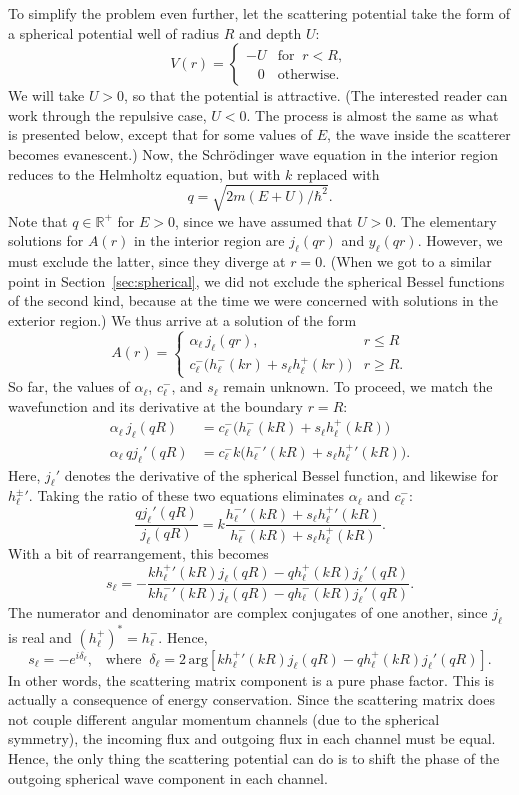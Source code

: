 \documentclass[pra,12pt]{revtex4}
\begin{document}
To simplify the problem even further, let the scattering potential
take the form of a spherical potential well of radius $R$ and depth
$U$:
$$V(r) = \begin{cases}-U &\mathrm{for}\;\; r < R, \\ \;\;\; 0 & \mathrm{otherwise}.\end{cases}$$
We will take $U > 0$, so that the potential is attractive.  (The
interested reader can work through the repulsive case, $U < 0$.  The
process is almost the same as what is presented below, except that for
some values of $E$, the wave inside the scatterer becomes evanescent.)
Now, the Schr\"odinger wave equation in the interior region reduces to
the Helmholtz equation, but with $k$ replaced with
$$q = \sqrt{2m(E+U)/\hbar^2}.$$
Note that $q \in \mathbb{R}^+$ for $E > 0$, since we have assumed
that $U > 0$.  The elementary solutions for $A(r)$ in the interior
region are $j_\ell(qr)$ and $y_\ell(qr)$.  However, we must exclude
the latter, since they diverge at $r = 0$.  (When we got to a similar
point in Section~\ref{sec:spherical}, we did not exclude the spherical
Bessel functions of the second kind, because at the time we were
concerned with solutions in the exterior region.)  We thus arrive at a
solution of the form
$$A(r) = \begin{cases} \alpha_\ell\, j_\ell(qr), & r \le R \\ c^-_\ell \Big(h^-_\ell(kr) + s_\ell h^+_\ell(kr)\Big) & r \ge R.\end{cases}$$
So far, the values of $\alpha_\ell$, $c^-_\ell$, and $s_\ell$ remain
unknown.  To proceed, we match the wavefunction and its
derivative at the boundary $r = R$:
$$\begin{aligned} \alpha_\ell\, j_\ell(qR) &= c^-_\ell \Big(h^-_\ell(kR) + s_\ell h^+_\ell(kR)\Big) \\ \alpha_\ell\, q j_\ell'(qR) &= c^-_\ell k \Big({h^-_\ell}'(kR) + s_\ell {h^+_\ell}'(kR)\Big).\end{aligned}$$
Here, $j_\ell'$ denotes the derivative of the spherical Bessel
function, and likewise for ${h_\ell^\pm}'$.  Taking the ratio of these
two equations eliminates $\alpha_\ell$ and $c_\ell^-$:
$$\frac{q j_\ell'(qR)}{j_\ell(qR)} = k \frac{{h^-_\ell}'(kR) + s_\ell {h^+_\ell}'(kR)}{h^-_\ell(kR) + s_\ell h^+_\ell(kR)}.$$
With a bit of rearrangement, this becomes
$$s_\ell = - \frac{k{h_\ell^+}'(kR) j_\ell(qR) - qh_\ell^+(kR)j_\ell'(qR)}{k{h_\ell^-}'(kR) j_\ell(qR) - qh_\ell^-(kR)j_\ell'(qR)}.$$
The numerator and denominator are complex conjugates of one another,
since $j_\ell$ is real and $(h_\ell^+)^* = h_\ell^-$.  Hence,
$$s_\ell = - e^{i\delta_\ell}, \;\;\;\mathrm{where}\;\; \delta_\ell = 2\,\mathrm{arg}\!\left[k{h_\ell^+}'(kR) j_\ell(qR) - qh_\ell^+(kR)j_\ell'(qR)\right].$$
In other words, the scattering matrix component is a pure phase
factor.  This is actually a consequence of energy conservation.  Since
the scattering matrix does not couple different angular momentum
channels (due to the spherical symmetry), the incoming flux and
outgoing flux in each channel must be equal.  Hence, the only thing
the scattering potential can do is to shift the phase of the outgoing
spherical wave component in each channel.
\end{document}
